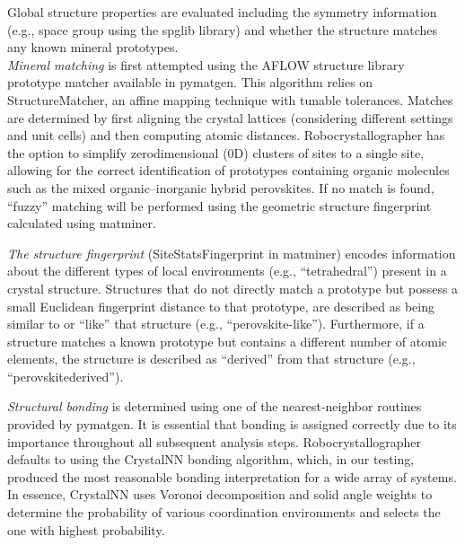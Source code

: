 \documentclass[book.tex]{subfiles}
\begin{document}

Global structure properties are evaluated including the symmetry information (e.g., space group using the spglib library) and whether the structure matches any known mineral prototypes. \\

\textit{Mineral matching} is first attempted using the AFLOW structure library prototype matcher available in pymatgen. This algorithm relies on StructureMatcher, an affine mapping technique with tunable tolerances. Matches are determined by first aligning the crystal lattices (considering different settings and unit cells) and then computing atomic distances. Robocrystallographer has the option to simplify zerodimensional (0D) clusters of sites to a single site, allowing for the correct identification of prototypes containing organic molecules such as the mixed organic–inorganic hybrid perovskites. If no match is found, “fuzzy” matching will be performed using the geometric structure fingerprint calculated using matminer. 

\textit{The structure fingerprint} (SiteStatsFingerprint in matminer) encodes information about the different types of local environments (e.g., “tetrahedral”) present in a crystal structure. Structures that do not directly match a prototype but possess a small Euclidean fingerprint distance to that prototype, are described as being similar to or “like” that structure (e.g., “perovskite-like”). Furthermore, if a structure matches a known prototype but contains a different number of atomic elements, the structure is described as “derived” from that structure (e.g., “perovskitederived”). 

\textit{Structural bonding} is determined using one of the nearest-neighbor routines provided by pymatgen. It is essential that bonding is assigned correctly due to its importance throughout all subsequent analysis steps. Robocrystallographer defaults to using the CrystalNN bonding algorithm, which, in our testing, produced the most reasonable bonding interpretation for a wide array of systems. In essence, CrystalNN uses Voronoi decomposition and solid angle weights to determine the probability of various coordination environments and selects the one with highest probability.
\end{document}
